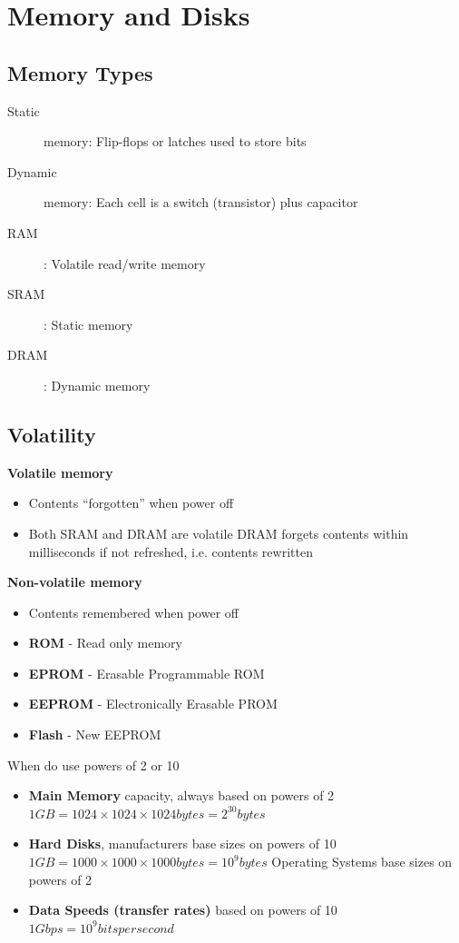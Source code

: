 \section{Memory and Disks}
\subsection{Memory Types}
\begin{description}
	\item[Static] memory: Flip-flops or latches used to store bits
	\item[Dynamic] memory: Each cell is a switch (transistor) plus capacitor
	\item[RAM]: Volatile read/write memory
	\item[SRAM]: Static memory
	\item[DRAM]: Dynamic memory
\end{description}

\subsection{Volatility}
\textbf{Volatile memory}
\begin{itemize}
	\item Contents ``forgotten'' when power off
	\item Both SRAM and DRAM are volatile
	\subitem DRAM forgets contents within milliseconds if not refreshed, i.e. contents rewritten	
\end{itemize}
\textbf{Non-volatile memory}
\begin{itemize}
	\item Contents remembered when power off	
	\item \textbf{ROM} - Read only memory
	\item \textbf{EPROM} - Erasable Programmable ROM
	\item \textbf{EEPROM} - Electronically Erasable PROM
	\item \textbf{Flash} - New EEPROM
\end{itemize}

\begin{note}{When do use powers of 2 or 10}
	\begin{itemize}
		\item \textbf{Main Memory} capacity, always 	based on powers of 2
		\subitem $1GB=1024\times1024\times1024 bytes = 2^{30} bytes$
		\item \textbf{Hard Disks}, manufacturers base sizes on powers of 10
		\subitem $1GB = 1000\times1000\times1000 bytes=10^9bytes$
		\subitem Operating Systems base sizes on powers of 2
		\item \textbf{Data Speeds (transfer rates)} based on powers of 10
		\subitem $1Gbps = 10^9 bits per second$
	\end{itemize}
\end{note}

